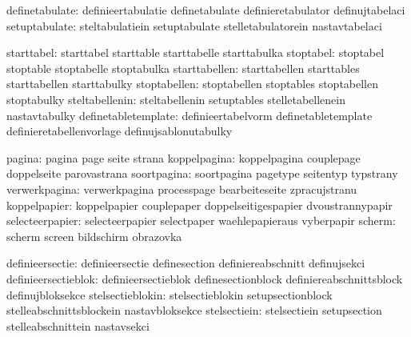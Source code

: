                definetabulate:  definieertabulatie           definetabulate
                                definieretabulator           definujtabelaci
                setuptabulate:  steltabulatiein              setuptabulate
                                stelletabulatorein           nastavtabelaci

                   starttabel:  starttabel                   starttable
                                starttabelle                 starttabulka
                    stoptabel:  stoptabel                    stoptable
                                stoptabelle                  stoptabulka
                starttabellen:  starttabellen                starttables
                                starttabellen                starttabulky
                 stoptabellen:  stoptabellen                 stoptables
                                stoptabellen                 stoptabulky
               steltabellenin:  steltabellenin               setuptables
                                stelletabellenein            nastavtabulky
          definetabletemplate:  definieertabelvorm           definetabletemplate
                                definieretabellenvorlage     definujsablonutabulky

                       pagina:  pagina                       page
                                seite                        strana
                 koppelpagina:  koppelpagina                 couplepage
                                doppelseite                  parovastrana
                  soortpagina:  soortpagina                  pagetype
                                seitentyp                    typstrany
                verwerkpagina:  verwerkpagina                processpage
                                bearbeiteseite               zpracujstranu
                 koppelpapier:  koppelpapier                 couplepaper
                                doppelseitigespapier         dvoustrannypapir
              selecteerpapier:  selecteerpapier              selectpaper
                                waehlepapieraus              vyberpapir
                       scherm:  scherm                       screen
                                bildschirm                   obrazovka

              definieersectie:  definieersectie              definesection
                                definiereabschnitt           definujsekci
          definieersectieblok:  definieersectieblok          definesectionblock
                                definiereabschnittsblock     definujbloksekce
             stelsectieblokin:  stelsectieblokin             setupsectionblock
                                stelleabschnittsblockein     nastavbloksekce
                 stelsectiein:  stelsectiein                 setupsection
                                stelleabschnittein           nastavsekci

